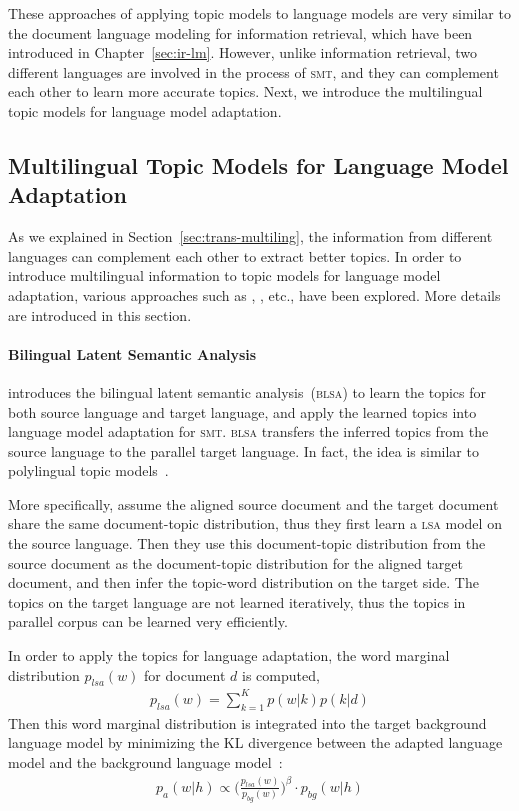 These approaches of applying topic models to language models are very similar to the document language modeling for information retrieval, which have been introduced in Chapter~\ref{sec:ir-lm}. However, unlike information retrieval, two different languages are involved in the process of \textsc{smt}, and they can complement each other to learn more accurate topics. Next, we introduce the multilingual topic models for language model adaptation.

\subsection{Multilingual Topic Models for Language Model Adaptation}

As we explained in Section~\ref{sec:trans-multiling}, the information from different languages can complement each other to extract better topics. In order to introduce multilingual information to topic models for language model adaptation, various approaches such as \cite{Tam-2007}, \cite{Ruiz-2011}, \cite{Yu-2013} etc., have been explored. More details are introduced in this section.


\paragraph{Bilingual Latent Semantic Analysis}

\cite{Tam-2007} introduces the bilingual latent semantic analysis~(\textsc{blsa}) to learn the topics for both source language and target language, and apply the learned topics into language model adaptation for \textsc{smt}. \textsc{blsa} transfers the inferred topics from the source language to the parallel target language. In fact, the idea is similar to polylingual topic models~\citep{mimno-09}.

More specifically, \cite{Tam-2007} assume the aligned source document and the target document share the same document-topic distribution, thus they first learn a \textsc{lsa} model on the source language. Then they use this document-topic distribution from the source document as the document-topic distribution for the aligned target document, and then infer the topic-word distribution on the target side. The topics on the target language are not learned iteratively, thus the topics in parallel corpus can be learned very efficiently. 

In order to apply the topics for language adaptation, the word marginal distribution $p_{lsa}(w)$ for document $d$ is computed,
\begin{align}
p_{lsa}(w) = \sum_{k=1}^K p(w|k) p(k|d)
\end{align}
Then this word marginal distribution is integrated into the target background language model by minimizing the KL divergence between the adapted language model and the background language model~\citep{Kneser-1997b}:
\begin{align}
\label{eq:mdi}
p_a(w|h) \propto \Big( \frac{p_{lsa}(w)}{p_{bg}(w)} \Big) ^{\beta} \cdot p_{bg}(w|h)
\end{align}

